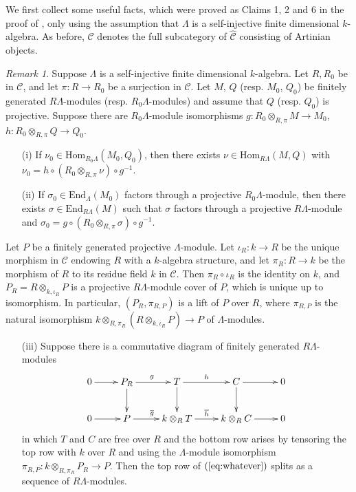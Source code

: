 \documentclass{amsart}
\theoremstyle{plain}
\theoremstyle{definition}
\theoremstyle{remark}
\newtheorem{rem}[thm]{Remark}
\begin{document}
We first collect some useful facts, which were proved as Claims 1, 2 and 6
in the proof of \cite[Thm. 2.6]{blehervelez}, only using the assumption that $\Lambda$ is a self-injective
finite dimensional $k$-algebra. As before, $\mathcal{C}$ denotes the full subcategory of $\hat{\mathcal{C}}$ 
consisting of Artinian objects.

\begin{rem}
\label{rem:josepaper}
Suppose $\Lambda$ is a self-injective finite dimensional $k$-algebra.
Let $R,R_0$ be in $\mathcal{C}$, and let $\pi:R\to R_0$ be a surjection in $\mathcal{C}$.
Let $M$, $Q$ (resp. $M_0$, $Q_0$) be finitely generated $R\Lambda$-modules
(resp. $R_0\Lambda$-modules) and assume that $Q$ (resp. $Q_0$) is projective. 
Suppose there are
$R_0\Lambda$-module isomorphisms $g:R_0\otimes_{R,\pi} M \to M_0$,
$h:R_0\otimes_{R,\pi} Q\to Q_0$. 
\begin{enumerate}
\item[(i)] 
If $\nu_0\in \mathrm{Hom}_{R_0\Lambda}(M_0, Q_0)$, then there
exists $\nu\in \mathrm{Hom}_{R\Lambda}(M, Q)$ with $\nu_0=
h\circ(R_0\otimes_{R,\pi}\nu)\circ g^{-1}$.
\item[(ii)]
If $\sigma_0\in \mathrm{End}_{\Lambda}(M_0)$  factors through a projective 
$R_0 \Lambda$-module, then there exists $\sigma
\in  \mathrm{End}_{R\Lambda}(M)$ such that $\sigma$ factors through a projective
$R\Lambda$-module and $\sigma_0=g\circ (R_0\otimes_{R,\pi}\sigma)\circ g^{-1}$.
\end{enumerate}
Let $P$ be a finitely generated projective $\Lambda$-module. 
Let $\iota_R:k\to R$ be the unique morphism in $\mathcal{C}$ endowing $R$ with a $k$-algebra structure,
and let $\pi_R:R\to k$ be the morphism of $R$ to its residue field $k$ in $\mathcal{C}$. Then 
$\pi_R\circ \iota_R$ is the identity on $k$, and $P_R=R\otimes_{k,\iota_R} P$ is a
projective $R\Lambda$-module cover of $P$, which is unique up to isomorphism. 
In particular, $(P_R,\pi_{R,P})$ is a lift of $P$ over $R$, where $\pi_{R,P}$ is the natural
isomorphism $k\otimes_{R,\pi_R}(R\otimes_{k,\iota_R}P)\to P$ of $\Lambda$-modules.
\begin{enumerate}
\item[(iii)]
Suppose there is a commutative
diagram of finitely generated $R\Lambda$-modules
\begin{equation}
\label{eq:whatever}
\xymatrix{
0\ar[r]&P_R\ar[d]\ar[r]^{g}&T\ar[d]\ar[r]^{h}& C\ar[d]\ar[r]&0\\
0\ar[r]&P\ar[r]^{\overline{g}}&k\otimes_R T\ar[r]^{\overline{h}}&k\otimes_R C\ar[r]&0}
\end{equation}
in which $T$ and $C$ are free over $R$ and the bottom row arises by tensoring the top row with 
$k$ over $R$ and using the $\Lambda$-module isomorphism $\pi_{R,P}:k\otimes_{R,\pi_R} P_R\to P$. 
Then the top row of $(\ref{eq:whatever})$ splits as a sequence of $R\Lambda$-modules.
\end{enumerate}
\end{rem}
\end{document}
